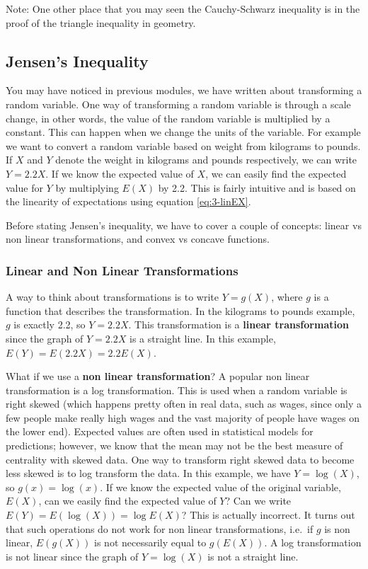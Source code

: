 \documentclass[
]{book}
\begin{document}
Note: One other place that you may seen the Cauchy-Schwarz inequality is in the proof of the triangle inequality in geometry.

\subsection{Jensen's Inequality}\label{jensens-inequality}

You may have noticed in previous modules, we have written about transforming a random variable. One way of transforming a random variable is through a scale change, in other words, the value of the random variable is multiplied by a constant. This can happen when we change the units of the variable. For example we want to convert a random variable based on weight from kilograms to pounds. If \(X\) and \(Y\) denote the weight in kilograms and pounds respectively, we can write \(Y = 2.2X\). If we know the expected value of \(X\), we can easily find the expected value for \(Y\) by multiplying \(E(X)\) by 2.2. This is fairly intuitive and is based on the linearity of expectations using equation \eqref{eq:3-linEX}.

Before stating Jensen's inequality, we have to cover a couple of concepts: linear vs non linear transformations, and convex vs concave functions.

\subsubsection{Linear and Non Linear Transformations}\label{linnonlin}

A way to think about transformations is to write \(Y = g(X)\), where \(g\) is a function that describes the transformation. In the kilograms to pounds example, \(g\) is exactly 2.2, so \(Y = 2.2X\). This transformation is a \textbf{linear transformation} since the graph of \(Y = 2.2X\) is a straight line. In this example, \(E(Y) = E(2.2X) = 2.2E(X)\).

What if we use a \textbf{non linear transformation}? A popular non linear transformation is a log transformation. This is used when a random variable is right skewed (which happens pretty often in real data, such as wages, since only a few people make really high wages and the vast majority of people have wages on the lower end). Expected values are often used in statistical models for predictions; however, we know that the mean may not be the best measure of centrality with skewed data. One way to transform right skewed data to become less skewed is to log transform the data. In this example, we have \(Y = \log(X)\), so \(g(x) = \log(x)\). If we know the expected value of the original variable, \(E(X)\), can we easily find the expected value of \(Y\)? Can we write \(E(Y) = E(\log(X)) = \log E(X)\)? This is actually incorrect. It turns out that such operations do not work for non linear transformations, i.e.~if \(g\) is non linear, \(E(g(X))\) is not necessarily equal to \(g(E(X))\). A log transformation is not linear since the graph of \(Y = \log(X)\) is not a straight line.
\end{document}
